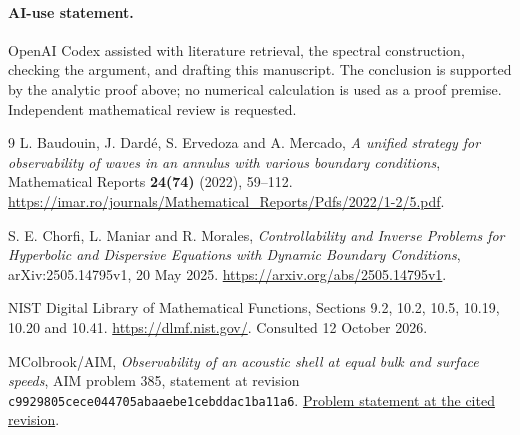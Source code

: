 \documentclass[11pt]{article}
\begin{document}
\paragraph{AI-use statement.}
OpenAI Codex assisted with literature retrieval, the spectral construction,
checking the argument, and drafting this manuscript. The conclusion is
supported by the analytic proof above; no numerical calculation is used as
a proof premise. Independent mathematical review is requested.

\begin{thebibliography}{9}
L. Baudouin, J. Dard\'e, S. Ervedoza and A. Mercado,
\emph{A unified strategy for observability of waves in an annulus with
various boundary conditions},
Mathematical Reports \textbf{24(74)} (2022), 59--112.
\url{https://imar.ro/journals/Mathematical_Reports/Pdfs/2022/1-2/5.pdf}.

S. E. Chorfi, L. Maniar and R. Morales,
\emph{Controllability and Inverse Problems for Hyperbolic and Dispersive
Equations with Dynamic Boundary Conditions},
arXiv:2505.14795v1, 20 May 2025.
\url{https://arxiv.org/abs/2505.14795v1}.

NIST Digital Library of Mathematical Functions,
Sections 9.2, 10.2, 10.5, 10.19, 10.20 and 10.41.
\url{https://dlmf.nist.gov/}.
Consulted 12 October 2026.

MColbrook/AIM, \emph{Observability of an acoustic shell
at equal bulk and surface speeds}, AIM problem 385, statement at revision
\texttt{c9929805cece044705abaaebe1cebddac1ba11a6}.
\href{https://github.com/MColbrook/AIM/blob/c9929805cece044705abaaebe1cebddac1ba11a6/problems/385-equal-speed-wentzell-wave-observability.md}{Problem statement at the cited revision}.
\end{thebibliography}
\end{document}
